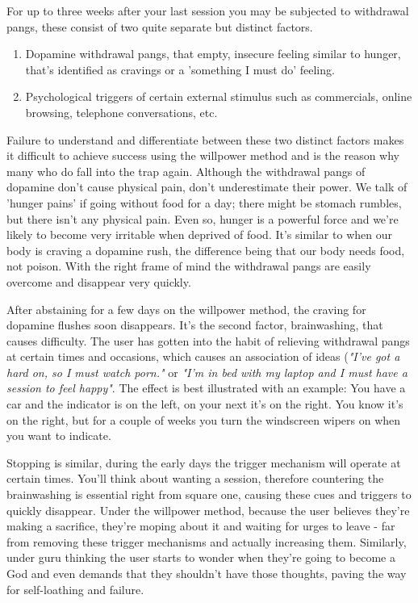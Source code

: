 \documentclass[easypeasy.tex]{subfiles}
\begin{document}
For up to three weeks after your last session you may be subjected to withdrawal pangs, these consist of two quite separate but distinct factors.
\begin{enumerate}
  \item Dopamine withdrawal pangs, that empty, insecure feeling similar to hunger, that's identified as cravings or a 'something I must do' feeling.

  \item Psychological triggers of certain external stimulus such as commercials, online browsing, telephone conversations, etc.
\end{enumerate}

Failure to understand and differentiate between these two distinct factors makes it difficult to achieve success using the willpower method and is the reason why many who do fall into the trap again. Although the withdrawal pangs of dopamine don't cause physical pain, don't underestimate their power. We talk of 'hunger pains' if going without food for a day; there might be stomach rumbles, but there isn't any physical pain. Even so, hunger is a powerful force and we're likely to become very irritable when deprived of food. It's similar to when our body is craving a dopamine rush, the difference being that our body needs food, not poison. With the right frame of mind the withdrawal pangs are easily overcome and disappear very quickly.

After abstaining for a few days on the willpower method, the craving for dopamine flushes soon disappears. It's the second factor, brainwashing, that causes difficulty. The user has gotten into the habit of relieving withdrawal pangs at certain times and occasions, which causes an association of ideas (\textit{"I've got a hard on, so I must watch porn."} or \textit{"I'm in bed with my laptop and I must have a session to feel happy"}. The effect is best illustrated with an example: You have a car and the indicator is on the left, on your next it's on the right. You know it's on the right, but for a couple of weeks you turn the windscreen wipers on when you want to indicate.

Stopping is similar, during the early days the trigger mechanism will operate at certain times. You'll think about wanting a session, therefore countering the brainwashing is essential right from square one, causing these cues and triggers to quickly disappear. Under the willpower method, because the user believes they're making a sacrifice, they're moping about it and waiting for urges to leave - far from removing these trigger mechanisms and actually increasing them. Similarly, under guru thinking the user starts to wonder when they're going to become a God and even demands that they shouldn't have those thoughts, paving the way for self-loathing and failure.
\end{document}
